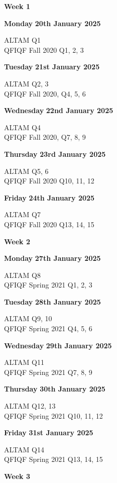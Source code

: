 \documentclass[hidelinks, 12pt]{article}
\theoremstyle{mydefstyle}
\theoremstyle{mythmstyle}
\begin{document}
\newpage

\begin{center}
\textbf{Week 1}
\end{center}

\textbf{Monday} \hfill \textbf{20th January 2025}

ALTAM Q1 \\
QFIQF Fall 2020 Q1, 2, 3

\textbf{Tuesday} \hfill \textbf{21st January 2025}

ALTAM Q2, 3 \\
QFIQF Fall 2020, Q4, 5, 6

\textbf{Wednesday} \hfill \textbf{22nd January 2025}

ALTAM Q4 \\
QFIQF Fall 2020, Q7, 8, 9

\textbf{Thursday} \hfill \textbf{23rd January 2025}

ALTAM Q5, 6 \\
QFIQF Fall 2020 Q10, 11, 12

\textbf{Friday} \hfill \textbf{24th January 2025}

ALTAM Q7 \\
QFIQF Fall 2020 Q13, 14, 15

\begin{center}
\textbf{Week 2}
\end{center}

\textbf{Monday} \hfill \textbf{27th January 2025}

ALTAM Q8 \\
QFIQF Spring 2021 Q1, 2, 3

\textbf{Tuesday} \hfill \textbf{28th January 2025}

ALTAM Q9, 10 \\
QFIQF Spring 2021 Q4, 5, 6

\textbf{Wednesday} \hfill \textbf{29th January 2025}

ALTAM Q11 \\
QFIQF Spring 2021 Q7, 8, 9

\textbf{Thursday} \hfill \textbf{30th January 2025}

ALTAM Q12, 13 \\
QFIQF Spring 2021 Q10, 11, 12

\textbf{Friday} \hfill \textbf{31st January 2025}

ALTAM Q14 \\
QFIQF Spring 2021 Q13, 14, 15

\begin{center}
\textbf{Week 3}
\end{center}
\end{document}
